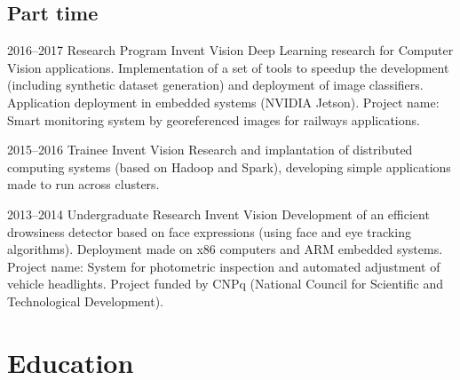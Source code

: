 \documentclass[a4paper]{cv-friggeri-x}
\begin{document}

\subsection{Part time}

\begin{entrylist}

\entry
    {2016--2017}
    {Research Program}%
    {Invent Vision}
    {Deep Learning research for Computer Vision applications. Implementation of a set of tools to speedup the development (including synthetic dataset generation) and deployment of image classifiers. Application deployment in embedded systems (NVIDIA Jetson). Project name: Smart monitoring system by georeferenced images for railways applications.}

\entry
    {2015--2016}
    {Trainee}
    {Invent Vision}
    {Research and implantation of distributed computing systems (based on Hadoop and Spark), developing simple applications made to run across clusters.}

\entry
    {2013--2014}
    {Undergraduate Research}
    {Invent Vision}
    {Development of an efficient drowsiness detector based on face expressions (using face and eye tracking algorithms). Deployment made on x86 computers and ARM embedded systems. Project name: System for photometric inspection and automated adjustment of vehicle headlights. Project funded by CNPq (National Council for Scientific and Technological Development).}



\end{entrylist}


\section{Education}
\end{document}
